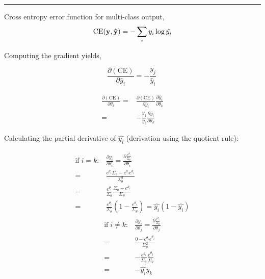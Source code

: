 \documentclass[letter,12pt]{article}
\begin{document}
\noindent\rule{\textwidth}{0.4pt}\vspace{5mm}

Cross entropy error function for multi-class output,
\begin{equation}
\textrm{CE}({\bf y},{\bf\hat{y}}) = -\sum_{i}{y_{i}\log{\hat{y_{i}}}}
\end{equation}

Computing the gradient yields, 

\begin{equation}
\frac{\partial(\textrm{CE})}{\partial{\hat{y}_{i}}} = -\frac{y_{j}}{\hat{y}_i}\
\label{eq:2b 1}
\end{equation}


\begin{align}
\frac{\partial(\textrm{CE})}{\partial{\theta_{k}}} = & \frac{\partial(\textrm{CE})}{\partial{\hat{y}_{i}}}\frac{\partial{\hat{y}_{i}}}{\partial{\theta_{k}}} \\
                                                                        = & -\frac{y_{j}}{\hat{y}_{i}}\frac{\partial{\hat{y}_{i}}}{\partial{\theta_{k}}}
\end{align}

Calculating the partial derivative of $\hat{y_{i}}$ (derivation using the quotient rule):

\begin{align}
\text{if} \; i = k :& \frac{\partial y_i}{\partial \theta_i}= \frac{\partial  \frac{e^{\theta_i}}{\Sigma_\theta}}{\partial \theta_i} \\
												=& \frac{e^{\theta_i}\Sigma_\theta - e^{\theta_i}e^{\theta_i}}{\Sigma_\theta^2} \\
												=&\frac{e^{\theta_i}}{\Sigma_\theta}\frac{\Sigma_\theta - e^{\theta_i}}{\Sigma_\theta} \\
												=& \frac{e^{\theta_i}}{\Sigma_\theta}(1-\frac{e^{\theta_i}}{\Sigma_\theta}) =  \hat{y_i} (1 - \hat{y_i}) \label{eq:2b 2}
\end{align}
\begin{align}
												\text{if} \; i \neq k :& \frac{\partial y_i}{\partial \theta_j} =\frac{\partial \frac{e^{\theta_i}}{\Sigma_\theta}}{\partial \theta_j}\\
												= &\frac{0 - e^{\theta_i}e^{\theta_j}}{\Sigma_\theta^2} \\
												=& -\frac{e^{\theta_i}}{\Sigma_\theta} \frac{e^{\theta_j}}{\Sigma_\theta} \\
												=& -\hat{y_i} y_k \label{eq:2b 3}
\end{align}
\end{document}
